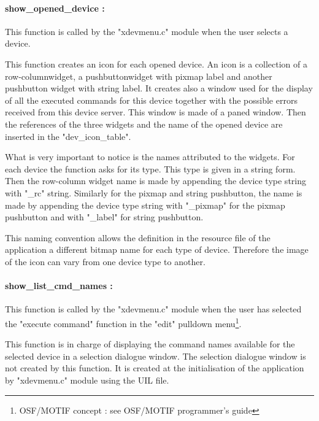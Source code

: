 
\paragraph{show\_opened\_device : }

This function is called by the "xdevmenu.c" module when the user selects a
device. 

This function creates an icon for each opened device. An icon is a
collection of a row-column\footnotemark[1]
widget, a pushbutton\footnotemark[1] widget with pixmap
label and another pushbutton widget with string label. 
It creates also a window used for the display of all the executed commands for
this device together with the possible errors received from this device server.
This window is made of a paned window\footnotemark[1].
Then the
references of the three widgets and the name of the opened device are inserted
in the "dev\_icon\_table".

What is very important to notice is the names attributed to the widgets. For
each device the function asks for its type. This type is given in a string form.
Then the row-column widget name is made by appending the device type string with
"\_rc" string. Similarly for the pixmap and string pushbutton, the name is made
by appending the device type string with "\_pixmap" for the pixmap pushbutton
and with "\_label" for string pushbutton.

This naming convention allows the definition in the resource file of the 
application
a different bitmap name for each type of device. Therefore the image of the
icon can vary from one device type to another.


\paragraph{show\_list\_cmd\_names : }

This function is called by the "xdevmenu.c" module when the user has selected
the "execute command" function in the "edit" pulldown
menu\footnote[1]{OSF/MOTIF concept : see OSF/MOTIF programmer's guide}.

This function is in charge of displaying the command names available for
the selected device in a selection dialogue window\footnotemark[1].
The selection dialogue window
is not created by this function. It is created at the initialisation of the
application by "xdevmenu.c" module using the UIL file.

